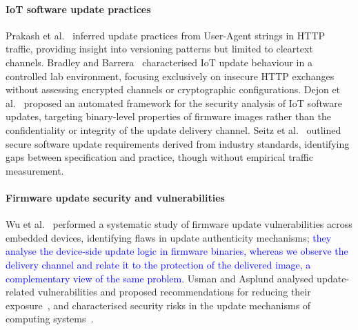\paragraph{IoT software update practices}
Prakash et al.~\cite{10.1145/3560835.3564551} inferred update practices from User-Agent strings in HTTP traffic, providing insight into versioning patterns but limited to cleartext channels.
Bradley and Barrera~\cite{10.1007/978-3-031-30122-3_25} characterised IoT update behaviour in a controlled lab environment, focusing exclusively on insecure HTTP exchanges without assessing encrypted channels or cryptographic configurations.
Dejon et al.~\cite{10.1007/978-3-030-41702-4_14} proposed an automated framework for the security analysis of IoT software updates, targeting binary-level properties of firmware images rather than the confidentiality or integrity of the update delivery channel.
Seitz et al.~\cite{icissp23} outlined secure software update requirements derived from industry standards, identifying gaps between specification and practice, though without empirical traffic measurement.

\paragraph{Firmware update security and vulnerabilities}
Wu et al.~\cite{294541} performed a systematic study of firmware update vulnerabilities across embedded devices, identifying flaws in update authenticity mechanisms; \textcolor{blue}{they analyse the device-side update logic in firmware binaries, whereas we observe the delivery channel and relate it to the protection of the delivered image, a complementary view of the same problem.}
Usman and Asplund analysed update-related vulnerabilities and proposed recommendations for reducing their exposure~\cite{10.1007/978-3-031-92886-4_7}, and characterised security risks in the update mechanisms of computing systems~\cite{USMAN2026105019}.
